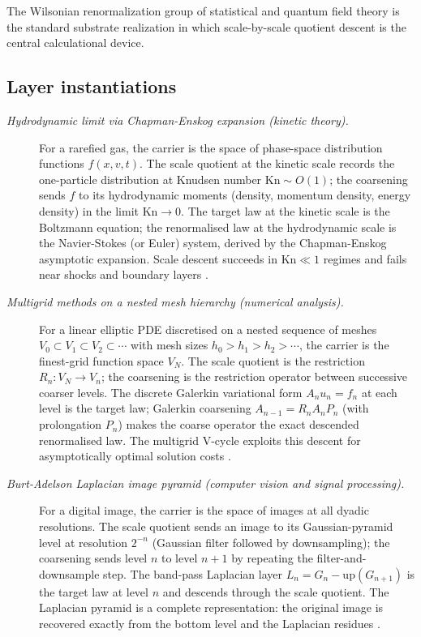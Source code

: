 \documentclass[11pt]{article}
\theoremstyle{definition}
\begin{document}
The Wilsonian renormalization group of statistical and quantum field
theory \citep{Wilson1975RG} is the standard substrate realization in
which scale-by-scale quotient descent is the central calculational
device.

\subsection*{Layer instantiations}\label{layer-inst:F35}

\begin{description}
\item[\emph{Hydrodynamic limit via Chapman-Enskog
expansion (kinetic theory).}]
For a rarefied gas, the carrier is the space of
phase-space distribution functions \(f(x,v,t)\).  The
scale quotient at the kinetic scale records the
one-particle distribution at Knudsen number
\(\mathrm{Kn}\sim O(1)\); the coarsening sends \(f\)
to its hydrodynamic moments (density, momentum
density, energy density) in the limit
\(\mathrm{Kn}\to 0\).  The target law at the kinetic
scale is the Boltzmann equation; the renormalised law
at the hydrodynamic scale is the Navier-Stokes (or
Euler) system, derived by the Chapman-Enskog
asymptotic expansion.  Scale descent succeeds in
\(\mathrm{Kn}\ll 1\) regimes and fails near shocks
and boundary layers \citep{Cercignani1988Boltzmann}.

\item[\emph{Multigrid methods on a nested mesh
hierarchy (numerical analysis).}]
For a linear elliptic PDE discretised on a nested
sequence of meshes
\(V_0\subset V_1\subset V_2\subset\cdots\) with mesh
sizes \(h_0>h_1>h_2>\cdots\), the carrier is the
finest-grid function space \(V_N\).  The scale quotient
is the restriction \(R_n:V_N\to V_n\); the coarsening
is the restriction operator between successive
coarser levels.  The discrete Galerkin variational
form \(A_n u_n=f_n\) at each level is the target law;
Galerkin coarsening \(A_{n-1}=R_n A_n P_n\) (with
prolongation \(P_n\)) makes the coarse operator the
exact descended renormalised law.  The multigrid
V-cycle exploits this descent for asymptotically
optimal solution costs \citep{Hackbusch1985Multigrid}.

\item[\emph{Burt-Adelson Laplacian image pyramid
(computer vision and signal processing).}]
For a digital image, the carrier is the space of
images at all dyadic resolutions.  The scale quotient
sends an image to its Gaussian-pyramid level at
resolution \(2^{-n}\) (Gaussian filter followed by
downsampling); the coarsening sends level \(n\) to
level \(n+1\) by repeating the filter-and-downsample
step.  The band-pass Laplacian layer
\(L_n=G_n-\mathrm{up}(G_{n+1})\) is the target law at
level \(n\) and descends through the scale quotient.
The Laplacian pyramid is a complete representation:
the original image is recovered exactly from the
bottom level and the Laplacian residues
\citep{BurtAdelson1983LaplacianPyramid}.


\end{description}
\end{document}
